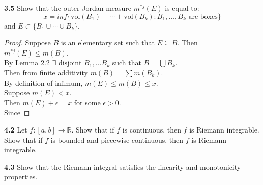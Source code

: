 \documentclass[12pt]{article}
\begin{document}
\hspace{-4 ex}\textbf{3.5} Show that the outer Jordan measure $m^{*j}(E)$ is equal to: $$x = inf\{\text{vol}(B_1)+\cdots+\text{vol}(B_k) : B_1,\ldots,B_k  \text{ are boxes} \}$$ and $E\subset \{B_1\cup\cdots\cup B_k\}$. \bigbreak

	\begin{proof}
		Suppose $B$ is an elementary set such that $E \subseteq B$. Then $m^{*j}(E) \leq m(B)$. \\
		By Lemma 2.2 $\exists \text{ disjoint } B_1,...B_k$ such that $B = \bigcup B_k$.\\
		Then from finite additivity $m(B) = \sum m(B_k)$. \\
		By definition of infimum, $m(E) \leq m(B) \leq x$. \\
		Suppose $m(E) < x$. \\
		Then $m(E) + \epsilon = x$ for some $\epsilon > 0$. \\
		Since 
		
	\end{proof}



\hspace{-4 ex}\textbf{4.2} Let $f\colon[a,b]\to\mathbb{R}$. Show that if $f$ is continuous, then $f$ is Riemann integrable. Show that if $f$ is bounded and piecewise continuous, then $f$ is Riemann integrable. \bigbreak





\hspace{-4 ex}\textbf{4.3} Show that the Riemann integral satisfies the linearity and monotonicity properties. \bigbreak
\end{document}
